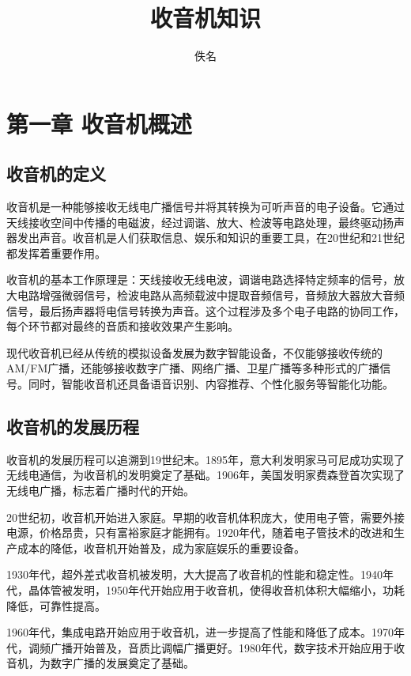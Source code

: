 \documentclass[12pt,UTF8]{ctexbook}
\title{\heiti\zihao{0} 收音机知识}
\author{佚名}
\date{}
\begin{document}
\maketitle
\tableofcontents

\frontmatter

\mainmatter

\chapter{第一章 收音机概述}

\section{收音机的定义}

收音机是一种能够接收无线电广播信号并将其转换为可听声音的电子设备。它通过天线接收空间中传播的电磁波，经过调谐、放大、检波等电路处理，最终驱动扬声器发出声音。收音机是人们获取信息、娱乐和知识的重要工具，在20世纪和21世纪都发挥着重要作用。

收音机的基本工作原理是：天线接收无线电波，调谐电路选择特定频率的信号，放大电路增强微弱信号，检波电路从高频载波中提取音频信号，音频放大器放大音频信号，最后扬声器将电信号转换为声音。这个过程涉及多个电子电路的协同工作，每个环节都对最终的音质和接收效果产生影响。

现代收音机已经从传统的模拟设备发展为数字智能设备，不仅能够接收传统的AM/FM广播，还能够接收数字广播、网络广播、卫星广播等多种形式的广播信号。同时，智能收音机还具备语音识别、内容推荐、个性化服务等智能化功能。

\section{收音机的发展历程}

收音机的发展历程可以追溯到19世纪末。1895年，意大利发明家马可尼成功实现了无线电通信，为收音机的发明奠定了基础。1906年，美国发明家费森登首次实现了无线电广播，标志着广播时代的开始。

20世纪初，收音机开始进入家庭。早期的收音机体积庞大，使用电子管，需要外接电源，价格昂贵，只有富裕家庭才能拥有。1920年代，随着电子管技术的改进和生产成本的降低，收音机开始普及，成为家庭娱乐的重要设备。

1930年代，超外差式收音机被发明，大大提高了收音机的性能和稳定性。1940年代，晶体管被发明，1950年代开始应用于收音机，使得收音机体积大幅缩小，功耗降低，可靠性提高。

1960年代，集成电路开始应用于收音机，进一步提高了性能和降低了成本。1970年代，调频广播开始普及，音质比调幅广播更好。1980年代，数字技术开始应用于收音机，为数字广播的发展奠定了基础。
\end{document}

